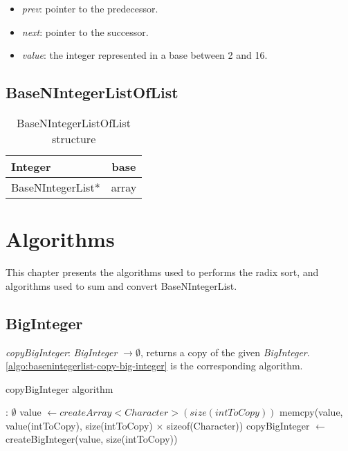 \documentclass[book, nodocumentinfo]{upmethodology-document}
\begin{document}
\begin{itemize}
    \item \emph{prev}: pointer to the predecessor.
    \item \emph{next}: pointer to the successor.
    \item \emph{value}: the integer represented in a base between 2 and 16.
\end{itemize}

\section{BaseNIntegerListOfList} \label{section:basen-integer-list-of-list}

\begin{table}[h]
    \centering
    \label{tab:basenintegerlistoflist-struct}

    \begin{tabular}{|l|c|}
        \hline
        Integer & base \\
        \hline
        BaseNIntegerList* & array \\
        \hline
    \end{tabular}

    \caption{BaseNIntegerListOfList structure}
\end{table}

\chapter{Algorithms} \label{chapter:algorithms}

This chapter presents the algorithms used to performs the radix sort, and algorithms used to sum and convert BaseNIntegerList.

\section{BigInteger}

\emph{copyBigInteger}: \emph{BigInteger} \(\rightarrow \emptyset\),
    returns a copy of the given \emph{BigInteger}.
    \ref{algo:basenintegerlist-copy-big-integer} is the corresponding algorithm.

\begin{algorithm}[H]
    \caption{copyBigInteger algorithm}
    \label{algo:basenintegerlist-copy-big-integer}

    \begin{algorithmic}
         : \(\emptyset\)
        \State value \(\leftarrow createArray<Character>(size(intToCopy))\)
            \State memcpy(value, value(intToCopy), size(intToCopy) \(×\) sizeof(Character))
            \State copyBigInteger \(\leftarrow\) createBigInteger(value, size(intToCopy))
        \EndFunction
    \end{algorithmic}
\end{algorithm}
\end{document}
